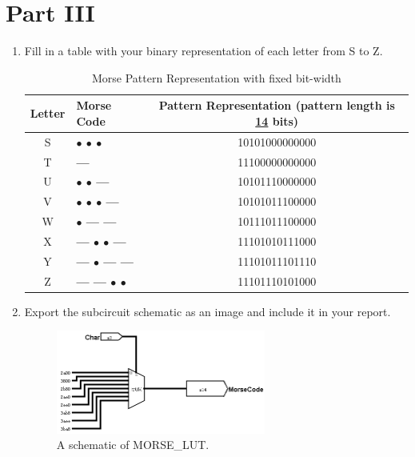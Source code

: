 \documentclass{article}
\begin{document}
\section{Part III}

\begin{enumerate}
\item Fill in a table with your binary representation of each letter from S to Z.

\begin{table}[ht!]
\centering
\begin{tabular}{|c|l|c|} \hline
    \textbf{Letter} & \textbf{Morse Code} & \textbf{Pattern Representation (pattern length is \underline{14} bits)} \\ \hline

    S & \textbf{$\bullet$ $\bullet$ $\bullet$} & 10101000000000\\ \hline
    T & \textbf{---} & 11100000000000\\ \hline
    U & \textbf{$\bullet$ $\bullet$ --- } & 10101110000000\\ \hline
    V & \textbf{$\bullet$ $\bullet$ $\bullet$ --- } & 10101011100000\\ \hline
    W & \textbf{$\bullet$ --- ---} & 10111011100000\\ \hline
    X & \textbf{--- $\bullet$ $\bullet$ ---} & 11101010111000\\ \hline
    Y & \textbf{--- $\bullet$ --- ---} & 11101011101110\\ \hline
    Z & \textbf{--- --- $\bullet$ $\bullet$} & 11101110101000\\ \hline

\end{tabular}
\caption{Morse Pattern Representation with fixed bit-width}
\label{tab:morse:pattern}
\end{table}

\item Export the subcircuit schematic as an image and include it in your report.

\begin{figure}[ht!]
    \centering
    \includegraphics[width=0.65\textwidth]{lab5_morse_lut.png}
    \caption{A schematic of MORSE\_LUT.}
    \label{f:morse_lut}
\end{figure}
\end{enumerate}
\end{document}
